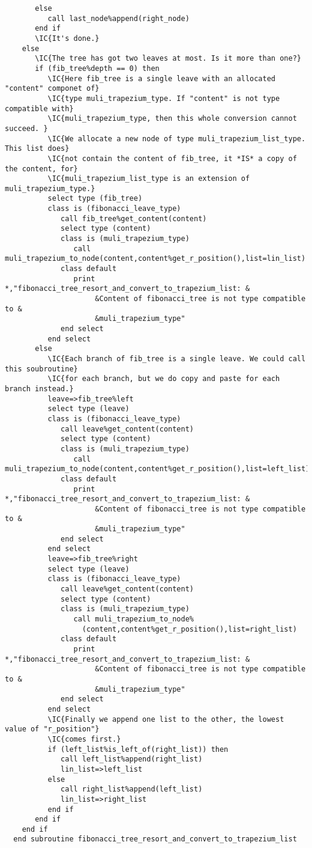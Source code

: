 \begin{Verbatim}
       else
          call last_node%append(right_node)
       end if
       \IC{It's done.}
    else
       \IC{The tree has got two leaves at most. Is it more than one?}
       if (fib_tree%depth == 0) then
          \IC{Here fib_tree is a single leave with an allocated "content" componet of}
          \IC{type muli_trapezium_type. If "content" is not type compatible with}
          \IC{muli_trapezium_type, then this whole conversion cannot succeed. }
          \IC{We allocate a new node of type muli_trapezium_list_type. This list does}
          \IC{not contain the content of fib_tree, it *IS* a copy of the content, for}
          \IC{muli_trapezium_list_type is an extension of muli_trapezium_type.}
          select type (fib_tree)
          class is (fibonacci_leave_type)
             call fib_tree%get_content(content)
             select type (content)
             class is (muli_trapezium_type)
                call muli_trapezium_to_node(content,content%get_r_position(),list=lin_list)
             class default
                print *,"fibonacci_tree_resort_and_convert_to_trapezium_list: &
                     &Content of fibonacci_tree is not type compatible to &
                     &muli_trapezium_type"
             end select
          end select
       else
          \IC{Each branch of fib_tree is a single leave. We could call this soubroutine}
          \IC{for each branch, but we do copy and paste for each branch instead.}
          leave=>fib_tree%left
          select type (leave)
          class is (fibonacci_leave_type)
             call leave%get_content(content)
             select type (content)
             class is (muli_trapezium_type)
                call muli_trapezium_to_node(content,content%get_r_position(),list=left_list)
             class default
                print *,"fibonacci_tree_resort_and_convert_to_trapezium_list: &
                     &Content of fibonacci_tree is not type compatible to &
                     &muli_trapezium_type"
             end select
          end select
          leave=>fib_tree%right
          select type (leave)
          class is (fibonacci_leave_type)
             call leave%get_content(content)
             select type (content)
             class is (muli_trapezium_type)
                call muli_trapezium_to_node%
                  (content,content%get_r_position(),list=right_list)
             class default
                print *,"fibonacci_tree_resort_and_convert_to_trapezium_list: &
                     &Content of fibonacci_tree is not type compatible to &
                     &muli_trapezium_type"
             end select
          end select
          \IC{Finally we append one list to the other, the lowest value of "r_position"}
          \IC{comes first.}
          if (left_list%is_left_of(right_list)) then
             call left_list%append(right_list)
             lin_list=>left_list
          else
             call right_list%append(left_list)
             lin_list=>right_list
          end if
       end if
    end if
  end subroutine fibonacci_tree_resort_and_convert_to_trapezium_list
\end{Verbatim}

